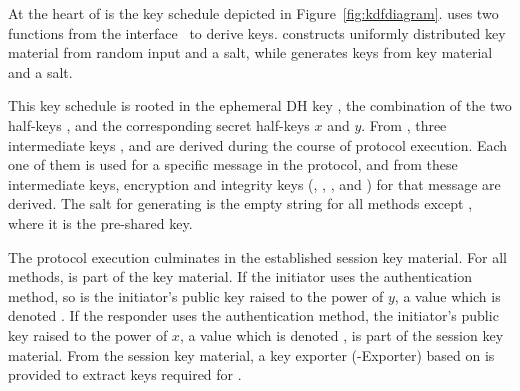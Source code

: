 %
%
%
At the heart of \mEdhoc{} is the key schedule depicted in
Figure~\ref{fig:kdfdiagram}.
%
\mEdhoc{} uses two functions from the \mHkdf{} interface~\cite{rfc5869} to derive keys.
%
\mHkdfExtract{} 
constructs uniformly distributed key material from random input and a salt,
while \mHkdfExpand{} generates keys from key material and a salt.
%
%

This key schedule is rooted in the ephemeral DH key \mGxy{}, the combination
of the two half-keys \mGx{}, \mGy{} and the corresponding secret half-keys $x$ and $y$.
%
From \mGxy{}, three intermediate keys \mPRKtwo, \mPRKthree{} and
\mPRKfour{} are derived during the course of protocol execution.
%
Each one of them is used for a specific message in the protocol, and from
these intermediate keys, encryption and integrity keys
(\mKtwoe, \mKtwom{}, \mKthreeae, and \mKthreem) for that message are derived.
%
The salt for generating \mPRKtwo{} is the empty string for all methods
except \mPskPsk{}, where it is the pre-shared key.%
%

%

The protocol execution culminates in the established session key material.
%
%
For all methods, \mGxy{} is part of the key material.
%
If the initiator uses the \mStat{} authentication method, so is
the initiator's public key \mGi{} raised to the power of $y$, a value which is
denoted \mGiy.
%
If the responder uses the \mStat{} authentication method,
the initiator's public key \mGr{} raised to the power of $x$, a value which is
denoted \mGrx{}, is part of the session key material.
%
From the session key material, a key exporter (\mEdhoc-Exporter) based on
\mHkdf{} is provided to extract keys required for \mOscore{}.
%
%

